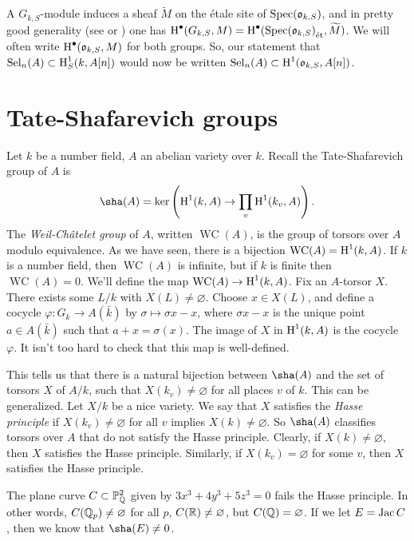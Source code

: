 \documentclass{article}
\begin{document}
A $G_{k,S}$-module induces a sheaf $\widetilde M$ on the \'etale site of 
$\operatorname{Spec}(\mathfrak{o}_{k,S})$, and in pretty good generality (see \cite{fo11} or 
\cite[II.2.9]{mi06}) one has 
$\operatorname{H}^\bullet(G_{k,S},M) = \operatorname{H}^\bullet({\operatorname{Spec}(\mathfrak{o}_{k,S})}_\textnormal{\'et},\widetilde M)$. We 
will often write $\operatorname{H}^\bullet(\mathfrak{o}_{k,S},M)$ for both groups. So, our statement 
that $\operatorname{Sel}_n(A)\subset \operatorname{H}_S^1(k,A[n])$ would now be written 
$\operatorname{Sel}_n(A)\subset \operatorname{H}^1(\mathfrak{o}_{k,S},A[n])$. 










\section{Tate-Shafarevich groups}

Let $k$ be a number field, $A$ an abelian variety over $k$. Recall the 
Tate-Shafarevich group of $A$ is 
\[
  \sha(A) = \ker\left(\h^1(k,A) \to \prod_v \h^1(k_v,A)\right) \text{.}
\]
The \emph{Weil-Ch\^atelet group} of $A$, written $\operatorname{WC}(A)$, is 
the group of torsors over $A$ modulo equivalence. As we have seen, there is a 
bijection $\operatorname{WC}(A) = \operatorname{H}^1(k,A)$. If $k$ is a number field, then 
$\operatorname{WC}(A)$ is infinite, but if $k$ is finite then 
$\operatorname{WC}(A)=0$. We'll define the map 
$\operatorname{WC}(A)\to \operatorname{H}^1(k,A)$. Fix an $A$-torsor $X$. There exists some 
$L/k$ with $X(L)\ne\varnothing$. Choose $x\in X(L)$, and define a cocycle 
$\varphi:G_k\to A(\bar k)$ by $\sigma\mapsto \sigma x - x$, where 
$\sigma x- x$ is the unique point $a\in A(\bar k)$ such that $a+x=\sigma(x)$. 
The image of $X$ in $\operatorname{H}^1(k,A)$ is the cocycle $\varphi$. It isn't too hard to 
check that this map is well-defined. 

This tells us that there is a natural bijection between $\sha(A)$ and the set 
of torsors $X$ of $A/k$, such that $X(k_v)\ne\varnothing$ for all places $v$ of 
$k$. This can be generalized. Let $X/k$ be a nice variety. We say that $X$ 
satisfies the \emph{Hasse principle} if $X(k_v)\ne\varnothing$ for all $v$ 
implies $X(k)\ne\varnothing$. So $\sha(A)$ classifies torsors over $A$ that 
do not satisfy the Hasse principle. Clearly, if $X(k)\ne\varnothing$, then 
$X$ satisfies the Hasse principle. Similarly, if $X(k_v)=\varnothing$ for some 
$v$, then $X$ satisfies the Hasse principle. 

\begin{example}[Selmer]
The plane curve $C\subset \mathbb{P}_{\mathbb{Q}}^2$ given by $3 x^3+4 y^3+5 z^3=0$ fails the 
Hasse principle. In other words, $C(\mathbb{Q}_p)\ne \varnothing$ for all $p$, 
$C(\mathbb{R})\ne\varnothing$, but $C(\mathbb{Q})=\varnothing$. If we let $E=\operatorname{Jac} C$, then 
we know that $\sha(E)\ne 0$. 
\end{example}
\end{document}

